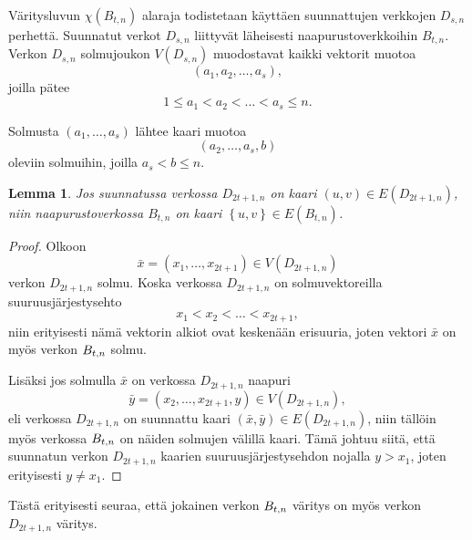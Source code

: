 \documentclass[finnish]{tktltiki2}
\newtheorem{lem}[lau]{Lemma}
\theoremstyle{definition}
\theoremstyle{remark}
\newcommand{\set}[1]{\left\{ #1 \right\}}
\newcommand{\Dsn}{D_{s,n}}
\begin{document}
Väritysluvun $\chi(B_{t,n})$ alaraja todistetaan käyttäen suunnattujen
verkkojen $\Dsn$ perhettä. Suunnatut verkot $\Dsn$ liittyvät läheisesti
naapurustoverkkoihin $B_{t,n}$. Verkon $\Dsn$ solmujoukon $V(\Dsn)$ muodostavat
kaikki vektorit muotoa
%
\begin{equation*}
    (a_1,a_2,\dots,a_s),
\end{equation*}
%
joilla pätee
%
\begin{equation*}
    1 \leq a_1 < a_2 < \dots < a_s \leq n.
\end{equation*}

Solmusta $(a_1,\dots,a_s)$ lähtee kaari muotoa
%
\begin{equation*}
    (a_2,\dots,a_s,b)
\end{equation*}
%
oleviin solmuihin, joilla $a_s < b \leq n$.

\begin{lem}
    Jos suunnatussa verkossa $D_{2t+1,n}$ on kaari $(u,v) \in E(D_{2t+1,n})$, niin
    naapurustoverkossa $B_{t,n}$ on kaari $\set{u,v} \in E(B_{t,n})$.
\end{lem}

\newcommand{\D}{D_{2t+1,n}}
\begin{proof}
    Olkoon
    \begin{equation*}
        \bar{x} = (x_1, \dots, x_{2t+1}) \in V(\D)
    \end{equation*}
    verkon $\D$ solmu.  Koska verkossa $\D$ on solmuvektoreilla
    suu\-ruus\-jär\-jes\-tys\-eh\-to
    \begin{equation*}
        x_1 < x_2 < \dots < x_{2t+1},
    \end{equation*}
    niin erityisesti nämä vektorin alkiot ovat keskenään erisuuria, joten
    vektori $\bar{x}$ on myös verkon $B_{t,n}$ solmu.

    Lisäksi jos solmulla $\bar{x}$ on verkossa $\D$ naapuri
    \begin{equation*}
            \bar{y} = (x_2, \dots, x_{2t+1}, y) \in V(\D),
    \end{equation*}
    eli verkossa $\D$ on suunnattu kaari $(\bar{x},\bar{y}) \in E(\D)$, niin
    tällöin myös verkossa $B_{t,n}$ on näiden solmujen välillä kaari. Tämä
    johtuu siitä, että suunnatun verkon $\D$ kaarien suuruusjärjestysehdon
    nojalla $y > x_1$, joten erityisesti $y \neq x_1$.
\end{proof}

Tästä erityisesti seuraa, että jokainen verkon $B_{t,n}$ väritys on myös verkon
$\D$ väritys.
\end{document}
